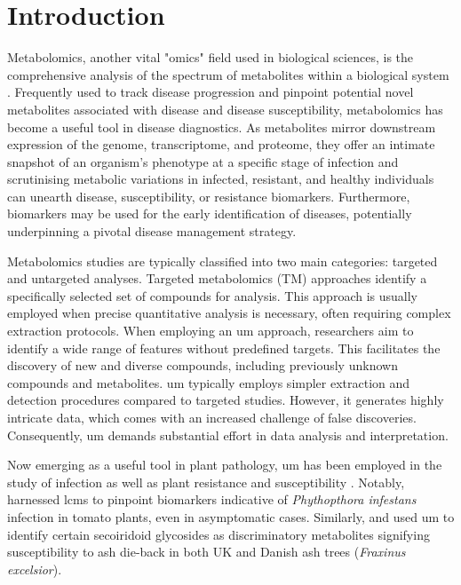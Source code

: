 
\section{Introduction}

Metabolomics, another vital "omics" field used in biological sciences, is the comprehensive analysis of the spectrum of metabolites within a biological system \parencite{Klassen2017}. Frequently used to track disease progression and pinpoint potential novel metabolites associated with disease and disease susceptibility, metabolomics has become a useful tool in disease diagnostics. As metabolites mirror downstream expression of the genome, transcriptome, and proteome, they offer an intimate snapshot of an organism's phenotype at a specific stage of infection and scrutinising metabolic variations in infected, resistant, and healthy individuals can unearth disease, susceptibility, or resistance biomarkers. Furthermore, biomarkers may be used for the early identification of diseases, potentially underpinning a pivotal disease management strategy. 

Metabolomics studies are typically classified into two main categories: targeted and untargeted analyses. Targeted metabolomics (TM) approaches identify a specifically selected set of compounds for analysis. This approach is usually employed when precise quantitative analysis is necessary, often requiring complex extraction protocols. When employing an \ac{um} approach, researchers aim to identify a wide range of features without predefined targets. This facilitates the discovery of new and diverse compounds, including previously unknown compounds and metabolites. \ac{um} typically employs simpler extraction and detection procedures compared to targeted studies. However, it generates highly intricate data, which comes with an increased challenge of false discoveries. Consequently, \ac{um} demands substantial effort in data analysis and interpretation.

Now emerging as a useful tool in plant pathology, \ac{um} has been employed in the study of infection as well as plant resistance and susceptibility \parencite{Allwood2021}. Notably, \textcite{Garcia2018} harnessed \ac{lcms} to pinpoint biomarkers indicative of \textit{Phythopthora infestans} infection in tomato plants, even in asymptomatic cases. Similarly, \textcite{Sambles2017} and \textcite{Sidda2020} used \ac{um} to identify certain secoiridoid glycosides as discriminatory metabolites signifying susceptibility to ash die-back in both UK and Danish ash trees (\textit{Fraxinus excelsior}).

